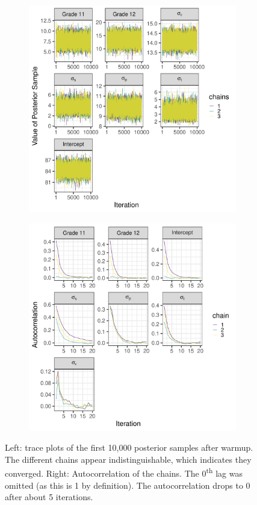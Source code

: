 \documentclass[a4paper]{article}
\begin{document}
\begin{figure}[!ht]
	\centering
	\begin{subfigure}{.5\textwidth}
		\centering
		\includegraphics[width=\linewidth]{figures/baselineTraceplots.pdf}
	\end{subfigure}%
	\begin{subfigure}{.5\textwidth}
		\centering
		\includegraphics[width=\linewidth]{figures/baselineAutocorrelationplots.pdf}
	\end{subfigure}%
	\caption{Left: trace plots of the first 10,000 posterior samples after warmup. The different chains appear indistinguishable, which indicates they converged. Right: Autocorrelation of the chains. The 0\textsuperscript{th} lag was omitted (as this is 1 by definition). The autocorrelation drops to 0 after about 5 iterations.}
	\label{fig:baselinePosteriorDiagnostics}
\end{figure}
\end{document}
